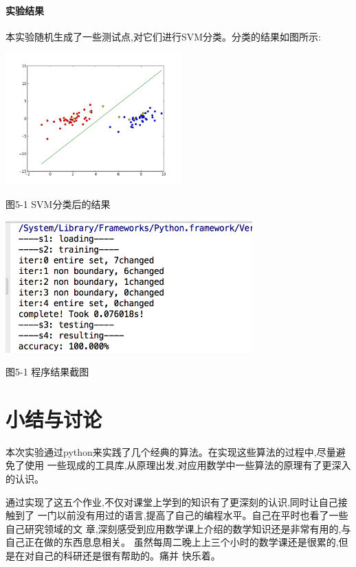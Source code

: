 \documentclass[10pt,a4paper]{article}
\theoremstyle{mythm}%
\numberwithin{equation}{section}
\begin{document}
 \paragraph{实验结果}本实验随机生成了一些测试点,对它们进行SVM分类。分类的结果如图所示:
 
 \includegraphics[height=2in]{figure5-2.png} 
 
图5-1  SVM分类后的结果

 \includegraphics[height=2in]{figure5-1.png} 
 
图5-1  程序结果截图
\section{小结与讨论}
本次实验通过python来实践了几个经典的算法。在实现这些算法的过程中,尽量避免了使用
一些现成的工具库,从原理出发,对应用数学中一些算法的原理有了更深入的认识。

通过实现了这五个作业,不仅对课堂上学到的知识有了更深刻的认识,同时让自己接触到了 一门以前没有用过的语言,提高了自己的编程水平。自己在平时也看了一些自己研究领域的文 章,深刻感受到应用数学课上介绍的数学知识还是非常有用的,与自己正在做的东西息息相关。 虽然每周二晚上上三个小时的数学课还是很累的,但是在对自己的科研还是很有帮助的。痛并 快乐着。

\begin{thebibliography}{MM}
\addtolength{\itemsep}{-0.5em}
\begin{small}

\end{small}
\end{thebibliography}
\newpage
\end{document}

